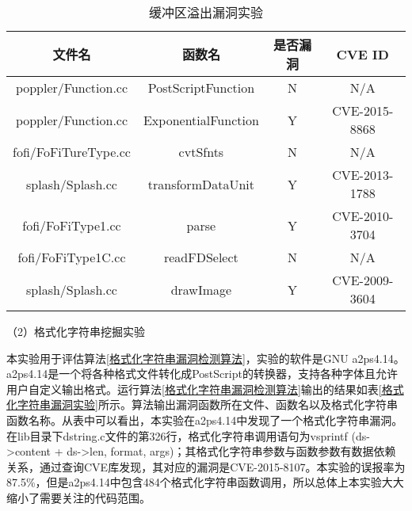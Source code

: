 {\begin{table}[ht]
\begin{center}
\caption{缓冲区溢出漏洞实验} \label{缓冲区溢出漏洞实验}
\begin{small}
\begin{tabular}{cccc}
\hline 
文件名 & 函数名 & 是否漏洞 & CVE ID\tabularnewline
\hline 
poppler/Function.cc & PostScriptFunction & N & N/A\tabularnewline
poppler/Function.cc & ExponentialFunction & Y & CVE-2015-8868\tabularnewline


fofi/FoFiTureType.cc & cvtSfnts & N & N/A\tabularnewline

splash/Splash.cc & transformDataUnit & Y & CVE-2013-1788\tabularnewline

 
fofi/FoFiType1.cc & parse & Y & CVE-2010-3704\tabularnewline

fofi/FoFiType1C.cc & readFDSelect & N & N/A\tabularnewline

splash/Splash.cc & drawImage & Y & CVE-2009-3604\tabularnewline

\hline 
\end{tabular}
\end{small}
\end{center}
\end{table}

（2）格式化字符串挖掘实验

本实验用于评估算法\ref{格式化字符串漏洞检测算法}，实验的软件是GNU a2ps4.14。a2ps4.14是一个将各种格式文件转化成PostScript的转换器，支持各种字体且允许用户自定义输出格式。运行算法\ref{格式化字符串漏洞检测算法}输出的结果如表\ref{格式化字符串漏洞实验}所示。算法输出漏洞函数所在文件、函数名以及格式化字符串函数名称。从表中可以看出，本实验在a2ps4.14中发现了一个格式化字符串漏洞。在lib目录下dstring.c文件的第326行，格式化字符串调用语句为vsprintf (ds->content + ds->len, format, args)；其格式化字符串参数与函数参数有数据依赖关系，通过查询CVE库发现，其对应的漏洞是CVE-2015-8107。本实验的误报率为87.5\%，但是a2ps4.14中包含484个格式化字符串函数调用，所以总体上本实验大大缩小了需要关注的代码范围。

}
